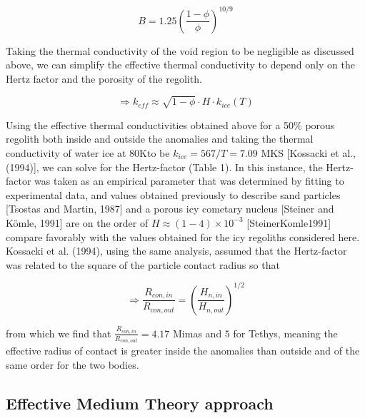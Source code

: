 \documentclass[11pt]{article} %
\begin{document}
	\begin{equation}
	B = 1.25 ( \frac{1-\phi}{\phi} )^{10/9}
	\end{equation}
	

	Taking the thermal conductivity of the void region to be negligible as discussed above, we can simplify the effective thermal conductivity to depend only on the Hertz factor and the porosity of the regolith.
	
	\begin{equation}\label{eq:unitcell}
	\Rightarrow k_{eff} \approx \sqrt{1-\phi}\cdot H \cdot k_{ice}(T)
	\end{equation}
	
	 Using the effective thermal conductivities obtained above for a 50\% porous regolith both inside and outside the anomalies and taking the thermal conductivity of water ice at 80Kto be $k_{ice} = 567/T = 7.09$ MKS [Kossacki et al., (1994)], we can solve for the Hertz-factor (Table 1). In this instance, the Hertz-factor was taken as an empirical parameter that was determined by fitting to experimental data, and values obtained previously to describe sand particles [Tsostas and Martin, 1987] and a porous icy cometary nucleus [Steiner and K\"{o}mle, 1991] are on the order of  $H  \approx (1 - 4) \times10^{-3}$ [SteinerKomle1991] compare favorably with the values obtained for the icy regoliths considered here. Kossacki et al. (1994), using the same analysis, assumed that the Hertz-factor was related to the square of the particle contact radius so that
	
	\begin{equation}
	\Rightarrow \frac{R_{con,in}}{R_{con,out}} = (\frac{H_{n, in}}{H_{n, out}})^{1/2}
	\end{equation}
	
	from which we find that $\frac{R_{con,in}}{R_{con,out}} = 4.17$ Mimas and $5$ for Tethys, meaning the effective radius of contact is greater inside the anomalies than outside and of the same order for the two bodies.
	
\subsection{Effective Medium Theory approach}
\end{document}
